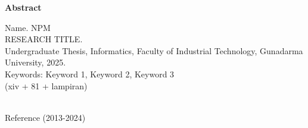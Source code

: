\newpage %
\begin{center}
\vspace{10mm}
\begin{large}\textbf{Abstract}\end{large}
\end{center}

\noindent
Name. NPM \\
RESEARCH TITLE. \\
Undergraduate Thesis, Informatics, Faculty of Industrial Technology, Gunadarma University, 2025. \\
Keywords: Keyword 1, Keyword 2, Keyword 3
\\
(xiv + 81 + lampiran) \\

\vspace{3mm}

\begin{singlespacing}
\lipsum[1]

\end{singlespacing}

\noindent \\

\noindent 
Reference (2013-2024)
